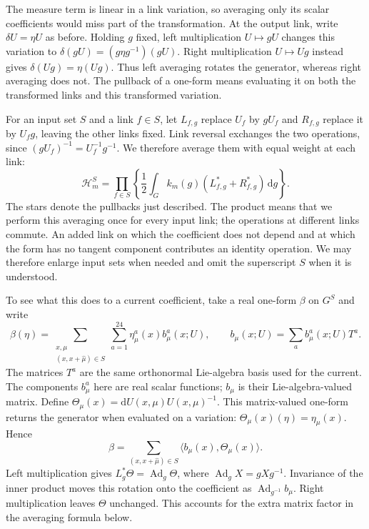 \documentclass[11pt,a4paper]{article}
\theoremstyle{remark}
\DeclareMathOperator{\Ad}{Ad}
\newcommand{\dd}{\mathrm d}
\begin{document}
The measure term is linear in a link variation, so averaging only its
scalar coefficients would miss part of the transformation. At the
output link, write $\delta U=\eta U$ as before. Holding $g$ fixed,
left multiplication $U\mapsto gU$ changes this variation to
$\delta(gU)=(g\eta g^{-1})(gU)$. Right multiplication
$U\mapsto Ug$ instead gives $\delta(Ug)=\eta(Ug)$.
Thus left averaging rotates the generator, whereas right averaging
does not. The pullback of a one-form means evaluating it on both the
transformed links and this transformed variation.

For an input set $S$ and a link $f\in S$, let $L_{f,g}$ replace
$U_f$ by $gU_f$ and $R_{f,g}$ replace it by $U_fg$, leaving the
other links fixed. Link reversal exchanges the two operations, since
$(gU_f)^{-1}=U_f^{-1}g^{-1}$. We therefore average them with equal
weight at each link:
\begin{equation}
 \mathcal H_m^S
 =\prod_{f\in S}\left\{\frac12\int_G k_m(g)
                 (L_{f,g}^*+R_{f,g}^*)\,\dd g\right\}.
 \label{poly:pullbacks}
\end{equation}
The stars denote the pullbacks just described. The product means that
we perform this averaging once for every input link; the operations
at different links commute. An added link on which the coefficient does
not depend and at which the form has no tangent component contributes
an identity operation. We may therefore enlarge input sets when needed
and omit the superscript $S$ when it is understood.

To see what this does to a current coefficient, take a real one-form
$\beta$ on $G^S$ and write
\begin{equation}
 \beta(\eta)=\sum_{\substack{x,\mu\\(x,x+\hat\mu)\in S}}
       \sum_{a=1}^{24}\eta_\mu^a(x)b_\mu^a(x;U),\qquad
 b_\mu(x;U)=\sum_a b_\mu^a(x;U)T^a .
\end{equation}
The matrices $T^a$ are the same orthonormal Lie-algebra basis used for
the current. The components $b_\mu^a$ here are real scalar functions;
$b_\mu$ is their Lie-algebra-valued matrix. Define
$\Theta_\mu(x)=\dd U(x,\mu)U(x,\mu)^{-1}$. This matrix-valued
one-form returns the generator when evaluated on a variation:
$\Theta_\mu(x)(\eta)=\eta_\mu(x)$. Hence
\begin{equation}
 \beta=\sum_{(x,x+\hat\mu)\in S}
                 \langle b_\mu(x),\Theta_\mu(x)\rangle .
\end{equation}
Left multiplication gives $L_g^*\Theta=\Ad_g\Theta$, where
$\Ad_g X=gXg^{-1}$. Invariance of the inner product moves this
rotation onto the coefficient as $\Ad_{g^{-1}}b_\mu$. Right
multiplication leaves $\Theta$ unchanged. This accounts for the
extra matrix factor in the averaging formula below.
\end{document}
